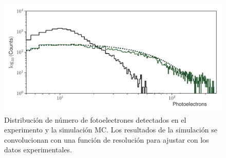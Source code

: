 \begin{figure}
        \centering
        \includegraphics[width=\textwidth]{photons-number.pdf}
        \caption{Distribución de número de fotoelectrones detectados en el experimento y la simulación MC. Los resultados de la simulación se convolucionan con una función de resolución para ajustar con los datos experimentales.}
        \label{fig:photons-number}
\end{figure}
